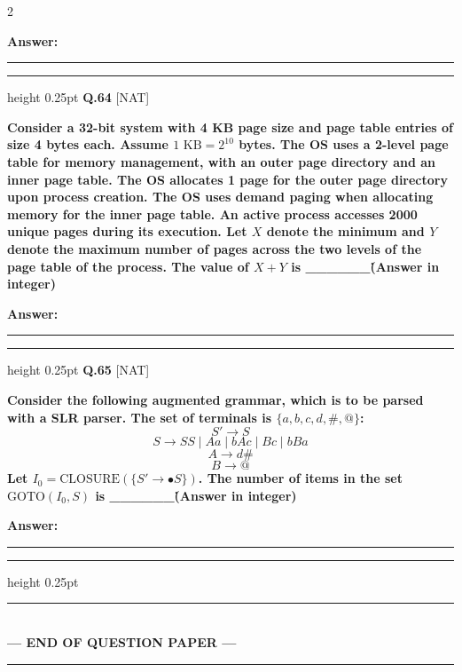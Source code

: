 \documentclass[a4paper,10pt,twoside]{article}
\begin{document}
\begin{multicols}{2}
\par\vspace{3pt}\noindent\textbf{Answer:} \rule{3.2cm}{0.4pt}
\par\vspace{6pt}\hrule height 0.25pt\vspace{6pt}
\noindent\textbf{Q.64} \hfill {\footnotesize\textsf{[NAT]}}
\par\vspace{2pt}
{\bfseries Consider a 32-bit system with 4 KB page size and page table entries of size 4 bytes each. Assume $1\text{ KB} = 2^{10}$ bytes. The OS uses a 2-level page table for memory management, with an outer page directory and an inner page table. The OS allocates 1 page for the outer page directory upon process creation. The OS uses demand paging when allocating memory for the inner page table. An active process accesses 2000 unique pages during its execution. Let $X$ denote the minimum and $Y$ denote the maximum number of pages across the two levels of the page table of the process. The value of $X + Y$ is \_\_\_\_\_\_\. (Answer in integer) \par}
\par\vspace{3pt}\noindent\textbf{Answer:} \rule{3.2cm}{0.4pt}
\par\vspace{6pt}\hrule height 0.25pt\vspace{6pt}
\noindent\textbf{Q.65} \hfill {\footnotesize\textsf{[NAT]}}
\par\vspace{2pt}
{\bfseries Consider the following augmented grammar, which is to be parsed with a SLR parser. The set of terminals is $\{a,b,c,d,\#,@\}$:
\[ S' \to S \]
\[ S \to SS \mid Aa \mid bAc \mid Bc \mid bBa \]
\[ A \to d\# \]
\[ B \to @ \]
Let $I_0 = \text{CLOSURE}(\{S' \to \bullet S\})$. The number of items in the set $\text{GOTO}(I_0, S)$ is \_\_\_\_\_\_\. (Answer in integer) \par}
\par\vspace{3pt}\noindent\textbf{Answer:} \rule{3.2cm}{0.4pt}
\par\vspace{6pt}\hrule height 0.25pt\vspace{6pt}
\end{multicols}
\vspace{8pt}
\begin{center}
\rule{0.35\linewidth}{0.5pt}\\[2pt]
\textbf{\small --- END OF QUESTION PAPER ---}\\[-8pt]
\rule{0.35\linewidth}{0.5pt}
\end{center}
\vspace{10pt}
\end{document}
